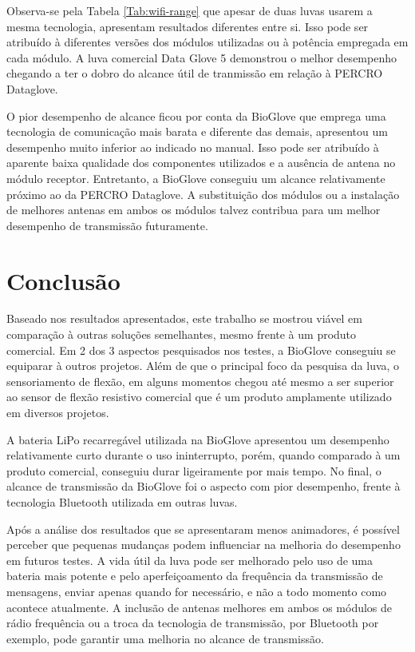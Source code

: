 \documentclass[
	12pt,				%
	openright,			%
	oneside,			%
	a4paper,			%
	english,			%
	brazil				%
	]{abntex2}
\begin{document}
			Observa-se pela Tabela \ref{Tab:wifi-range} que apesar de duas luvas usarem a mesma tecnologia, apresentam resultados diferentes entre si. Isso pode ser atribuído à diferentes versões dos módulos utilizadas ou à potência empregada em cada módulo. A luva comercial Data Glove 5 demonstrou o melhor desempenho chegando a ter o dobro do alcance útil de tranmissão em relação à PERCRO Dataglove.

			O pior desempenho de alcance ficou por conta da BioGlove que emprega uma tecnologia de comunicação mais barata e diferente das demais, apresentou um desempenho muito inferior ao indicado no manual. Isso pode ser atribuído à aparente baixa qualidade dos componentes utilizados e a ausência de antena no módulo receptor. Entretanto, a BioGlove conseguiu um alcance relativamente próximo ao da PERCRO Dataglove. A substituição dos módulos ou a instalação de melhores antenas em ambos os módulos talvez contribua para um melhor desempenho de transmissão futuramente.





		\chapter{Conclusão}
		
		Baseado nos resultados apresentados, este trabalho se mostrou viável em comparação à outras soluções semelhantes, mesmo frente à um produto comercial. Em 2 dos 3 aspectos pesquisados nos testes, a BioGlove conseguiu se equiparar à outros projetos. Além de que o principal foco da pesquisa da luva, o sensoriamento de flexão, em alguns momentos chegou até mesmo a ser superior ao sensor de flexão resistivo comercial que é um produto amplamente utilizado em diversos projetos.

		A bateria LiPo recarregável utilizada na BioGlove apresentou um desempenho relativamente curto durante o uso ininterrupto, porém, quando comparado à um produto comercial, conseguiu durar ligeiramente por mais tempo. No final, o alcance de transmissão da BioGlove foi o aspecto com pior desempenho, frente à tecnologia Bluetooth utilizada em outras luvas.

		Após a análise dos resultados que se apresentaram menos animadores, é possível perceber que pequenas mudanças podem influenciar na melhoria do desempenho em futuros testes. A vida útil da luva pode ser melhorado pelo uso de uma bateria mais potente e pelo aperfeiçoamento da frequência da transmissão de mensagens, enviar apenas quando for necessário, e não a todo momento como acontece atualmente. A inclusão de antenas melhores em ambos os módulos de rádio frequência ou a troca da tecnologia de transmissão, por Bluetooth por exemplo, pode garantir uma melhoria no alcance de transmissão.
\end{document}
